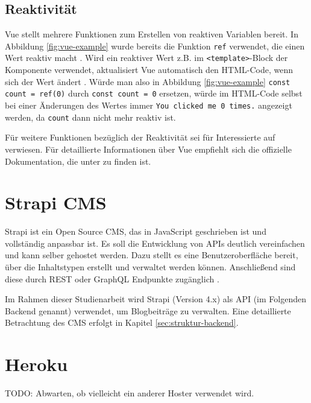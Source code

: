 %
%
\subsection{Reaktivität}
Vue stellt mehrere Funktionen zum Erstellen von reaktiven Variablen bereit. In Abbildung \ref{fig:vue-example} wurde bereits die Funktion \lstinline{ref} verwendet, die einen Wert reaktiv macht \cite[vgl.][]{VueApiReactiveCore}. Wird ein reaktiver Wert z.B. im \lstinline{<template>}-Block der Komponente verwendet, aktualisiert Vue automatisch den HTML-Code, wenn sich der Wert ändert \cite[vgl.][]{VueReactiveFundamentals}. Würde man also in Abbildung \ref{fig:vue-example} \glqq \lstinline{const count = ref(0)}\grqq{} durch \glqq \lstinline{const count = 0}\grqq{} ersetzen, würde im HTML-Code selbst bei einer Änderungen des Wertes immer \glqq \lstinline{You clicked me 0 times.}\grqq{} angezeigt werden, da \lstinline{count} dann nicht mehr reaktiv ist.

Für weitere Funktionen bezüglich der Reaktivität sei für Interessierte auf \cite{VueApiReactiveCore} verwiesen. Für detaillierte Informationen über Vue empfiehlt sich die offizielle Dokumentation, die unter \cite{VueIntroduction} zu finden ist.

%
%
\section{Strapi CMS}
Strapi ist ein Open Source CMS, das in JavaScript geschrieben ist und vollständig anpassbar ist. Es soll die Entwicklung von APIs deutlich vereinfachen und kann selber gehostet werden. Dazu stellt es eine Benutzeroberfläche bereit, über die Inhaltstypen erstellt und verwaltet werden können. Anschließend sind diese durch REST oder GraphQL Endpunkte zugänglich \cite[vgl.][]{Strapi}.

Im Rahmen dieser Studienarbeit wird Strapi (Version 4.x) als API (im Folgenden \glqq Backend\grqq{} genannt) verwendet, um Blogbeiträge zu verwalten. Eine detaillierte Betrachtung des CMS erfolgt in Kapitel \ref{sec:struktur-backend}.

%
%
\section{Heroku}
TODO: Abwarten, ob vielleicht ein anderer Hoster verwendet wird.
